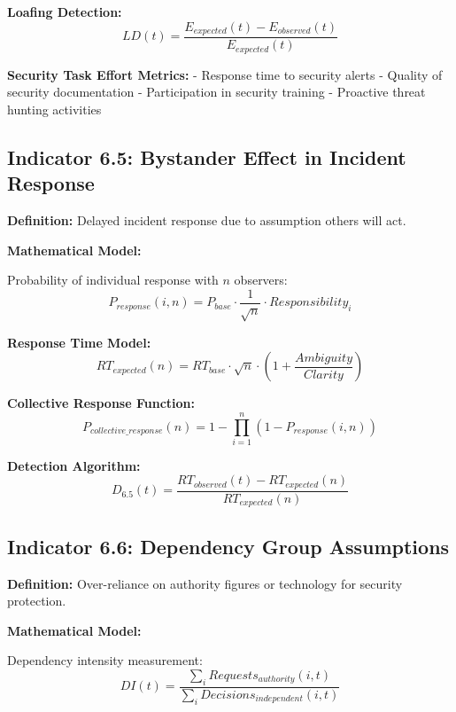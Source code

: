 \documentclass[11pt,a4paper]{article}
\begin{document}
\textbf{Loafing Detection:}
\begin{equation}
LD(t) = \frac{E_{expected}(t) - E_{observed}(t)}{E_{expected}(t)}
\end{equation}

\textbf{Security Task Effort Metrics:}
- Response time to security alerts
- Quality of security documentation
- Participation in security training
- Proactive threat hunting activities

\subsection{Indicator 6.5: Bystander Effect in Incident Response}

\textbf{Definition:} Delayed incident response due to assumption others will act.

\textbf{Mathematical Model:}

Probability of individual response with $n$ observers:
\begin{equation}
P_{response}(i,n) = P_{base} \cdot \frac{1}{\sqrt{n}} \cdot Responsibility_i
\end{equation}

\textbf{Response Time Model:}
\begin{equation}
RT_{expected}(n) = RT_{base} \cdot \sqrt{n} \cdot \left(1 + \frac{Ambiguity}{Clarity}\right)
\end{equation}

\textbf{Collective Response Function:}
\begin{equation}
P_{collective\_response}(n) = 1 - \prod_{i=1}^n (1 - P_{response}(i,n))
\end{equation}

\textbf{Detection Algorithm:}
\begin{equation}
D_{6.5}(t) = \frac{RT_{observed}(t) - RT_{expected}(n)}{RT_{expected}(n)}
\end{equation}

\subsection{Indicator 6.6: Dependency Group Assumptions}

\textbf{Definition:} Over-reliance on authority figures or technology for security protection.

\textbf{Mathematical Model:}

Dependency intensity measurement:
\begin{equation}
DI(t) = \frac{\sum_{i} Requests_{authority}(i,t)}{\sum_{i} Decisions_{independent}(i,t)}
\end{equation}
\end{document}
